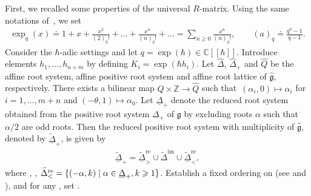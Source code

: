 \documentclass[10pt,a4paper]{amsart}
\numberwithin{equation}{section}
\begin{document}
First, we recalled some properties of the universal $R$-matrix. Using the same notations of~\cite{SMVN2}, we set
\begin{gather*}
 \exp_q(x)\doteq1+x+\frac{x^2}{(2)_q!}+\dots+\frac{x^n}{(n)_q!}+\dots=\sum_{n\geq0}\frac{x^n}{(n)_q!},\qquad
 (a)_q\doteq\frac{q^a-1}{q-1}.
\end{gather*}
 Consider the $\hbar$-adic settings and let $q=\exp(\hbar)\in\mathbb{C}[[\hbar]]$.
Introduce elements $h_1,\dots,h_{n+m}$ by defining $K_i=\exp(\hbar h_i)$.
Let $\widehat{\Delta}$, $\widehat{\Delta}_+$ and $\widehat{Q}$ be the affine root system, affine positive root system and affine root lattice of $\mathfrak{\hat{g}}$, respectively.
There exists a bilinear map $Q\times \mathbb{Z}\rightarrow\widehat{Q}$ such that~${(\alpha_i,0)\mapsto \alpha_i}$ for $i=1,\ldots,m+n$ and $(-\theta,1)\mapsto \alpha_0$. Let $\underline{\Delta}_+$ denote the reduced root system obtained from the positive root system $\Delta_+$ of $\mathfrak{g}$ by excluding roots $\alpha$ such that $\alpha/2$ are odd roots.
Then the reduced positive root system with multiplicity of $\mathfrak{\hat{g}}$, denoted by $\widetilde{\underline{\Delta}}_+$, is given by
\begin{gather*}
\widetilde{\underline{\Delta}}_+=\widetilde{\underline{\Delta}}^{\text{re}}_{>}\cup \widetilde{\Delta}^{\text{im}}\cup \widetilde{\underline{\Delta}}^{\text{re}}_{<},
\end{gather*}
where , , $\smash{\widetilde{\Delta}^{\text{re}}_{<}=\{ (-\alpha,k)} \mid \alpha\in \underline{\Delta}_+, \allowbreak {k\geqslant 1} \}$.
Establish a fixed ordering on \smash{$\widetilde{\underline{\Delta}}_+$} (see \cite[Section 3]{SMVN} and
\cite {XWLHZ}), and for any \smash{$\alpha\in\widetilde{\underline{\Delta}}_+$}, set .
\end{document}
